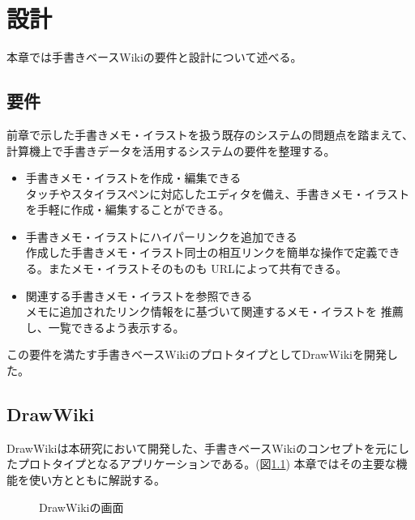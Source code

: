 \chapter{設計}
\label{chap:sekkei}

本章では手書きベースWikiの要件と設計について述べる。

\newpage

\section{要件}
前章で示した手書きメモ・イラストを扱う既存のシステムの問題点を踏まえて、計算機上で手書きデータを活用するシステムの要件を整理する。
\begin{itemize}
    \item 手書きメモ・イラストを作成・編集できる\\
    タッチやスタイラスペンに対応したエディタを備え、手書きメモ・イラストを手軽に作成・編集することができる。
    \item 手書きメモ・イラストにハイパーリンクを追加できる\\
    作成した手書きメモ・イラスト同士の相互リンクを簡単な操作で定義できる。またメモ・イラストそのものも
    URLによって共有できる。
    \item 関連する手書きメモ・イラストを参照できる\\
    メモに追加されたリンク情報をに基づいて関連するメモ・イラストを
    推薦し、一覧できるよう表示する。
\end{itemize}
この要件を満たす手書きベースWikiのプロトタイプとしてDrawWikiを開発した。

\section{DrawWiki}
DrawWikiは本研究において開発した、手書きベースWikiのコンセプトを元にしたプロトタイプとなるアプリケーションである。(図\ref{drawwiki})
本章ではその主要な機能を使い方とともに解説する。

\begin{figure}[htbp]
    \begin{center}
         \end{center}
    \caption{DrawWikiの画面}
    \label{drawwiki}
\end{figure}

